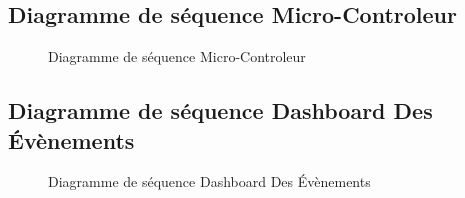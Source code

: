 \subsection{Diagramme de séquence Micro-Controleur}
\begin{figure}[hbt]
\centering
\right
\label{fig: DS Micro-Controleur}

  \caption{Diagramme de séquence Micro-Controleur}
\end{figure}


\break
\subsection{Diagramme de séquence Dashboard Des Évènements }
\begin{figure}[hbt]
\centering
\right
\label{fig: DS Dashboard Des Évènements}

  \caption{Diagramme de séquence Dashboard Des Évènements}
\end{figure}

